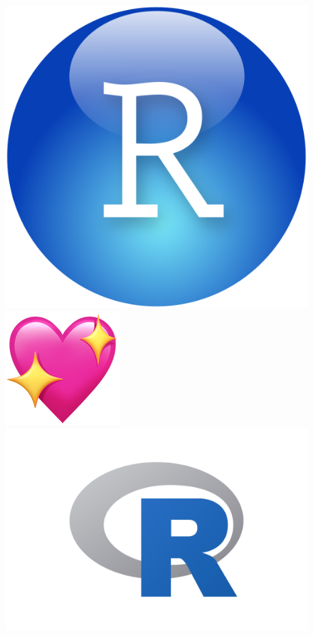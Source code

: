 \documentclass[
  a4paper,
  DIV=11]{scrreprt}
\theoremstyle{definition}
\theoremstyle{definition}
\theoremstyle{definition}
\theoremstyle{remark}
\begin{document}
\begin{figure}

\begin{minipage}{0.20\linewidth}
\includegraphics{img/R-logo.png}\end{minipage}%
%
\begin{minipage}{0.40\linewidth}
\includegraphics{img/sparkling_heart.png}\end{minipage}%
%
\begin{minipage}{0.40\linewidth}
\includegraphics{img/rlogo.png}\end{minipage}%

\end{figure}%
\end{document}
